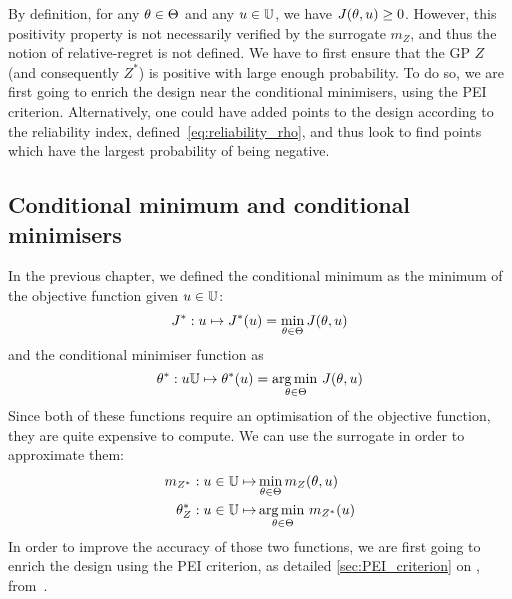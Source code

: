 \documentclass[../../Main_ManuscritThese.tex]{subfiles}
\begin{document}
By definition, for any $\theta\in \Theta$ and any $u \in \mathbb{U}$, we
have $J(\theta, u) \geq 0$.  However, this positivity property is not
necessarily verified by the surrogate $m_Z$, and thus the notion of
relative-regret is not defined. We have to first ensure that the GP
$Z$ (and consequently $Z^*$) is positive with large enough
probability.  To do so, we are first going to enrich the design near
the conditional minimisers, using the PEI criterion.  Alternatively,
one could have added points to the design according to the reliability
index, defined~\cref{eq:reliability_rho}, and thus look to find points
which have the largest probability of being negative.

\subsection{Conditional minimum and conditional minimisers}
\label{ssec:croco_cond_minimum_minimisers}
In the previous chapter, we defined the conditional minimum as the
minimum of the objective function given $u\in \mathbb{U}$:
\begin{equation}
  J^* : u \mapsto J^*(u) = \min_{\theta\in\Theta} J(\theta, u)
\end{equation}
and the conditional minimiser function as
\begin{equation}
  \theta^*:u \mathbb{U} \mapsto \theta^*(u) = \operatorname*{arg\,min \,}_{\theta \in \Theta} J(\theta, u)
\end{equation}
Since both of these functions require an optimisation of the objective
function, they are quite expensive to compute. We can use the
surrogate in order to approximate them:
\begin{align}
  m_{Z^*}: u\in\mathbb{U} \mapsto &\min_{\theta \in \Theta} m_Z(\theta, u) \\
  \theta^*_{Z}: u \in \mathbb{U} \mapsto &\operatorname*{arg\,min \,}_{\theta \in \Theta} m_{Z^*}(u)
\end{align}
In order to improve the accuracy of those two functions, we are first
going to enrich the design using the PEI criterion, as detailed
\cref{sec:PEI_criterion} on ,
from~\cite{ginsbourger_bayesian_2014}.
\end{document}

